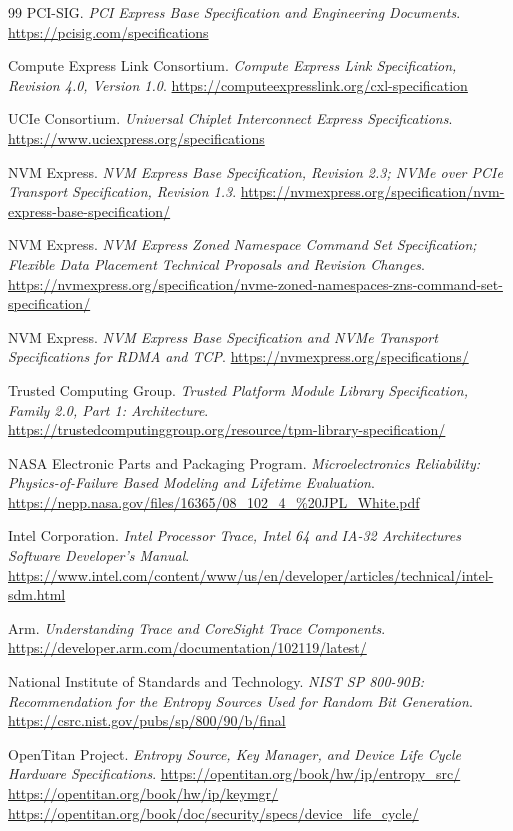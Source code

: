 \begin{thebibliography}{99}
PCI-SIG.
\emph{PCI Express Base Specification and Engineering Documents}.
\url{https://pcisig.com/specifications}

Compute Express Link Consortium.
\emph{Compute Express Link Specification, Revision 4.0, Version 1.0}.
\url{https://computeexpresslink.org/cxl-specification}

UCIe Consortium.
\emph{Universal Chiplet Interconnect Express Specifications}.
\url{https://www.uciexpress.org/specifications}

NVM Express.
\emph{NVM Express Base Specification, Revision 2.3; NVMe over PCIe Transport Specification, Revision 1.3}.
\url{https://nvmexpress.org/specification/nvm-express-base-specification/}

NVM Express.
\emph{NVM Express Zoned Namespace Command Set Specification; Flexible Data Placement Technical Proposals and Revision Changes}.
\url{https://nvmexpress.org/specification/nvme-zoned-namespaces-zns-command-set-specification/}

NVM Express.
\emph{NVM Express Base Specification and NVMe Transport Specifications for RDMA and TCP}.
\url{https://nvmexpress.org/specifications/}

Trusted Computing Group.
\emph{Trusted Platform Module Library Specification, Family 2.0, Part 1: Architecture}.
\url{https://trustedcomputinggroup.org/resource/tpm-library-specification/}

NASA Electronic Parts and Packaging Program.
\emph{Microelectronics Reliability: Physics-of-Failure Based Modeling and Lifetime Evaluation}.
\url{https://nepp.nasa.gov/files/16365/08_102_4_%20JPL_White.pdf}

Intel Corporation.
\emph{Intel Processor Trace, Intel 64 and IA-32 Architectures Software Developer's Manual}.
\url{https://www.intel.com/content/www/us/en/developer/articles/technical/intel-sdm.html}

Arm.
\emph{Understanding Trace and CoreSight Trace Components}.
\url{https://developer.arm.com/documentation/102119/latest/}

National Institute of Standards and Technology.
\emph{NIST SP 800-90B: Recommendation for the Entropy Sources Used for Random Bit Generation}.
\url{https://csrc.nist.gov/pubs/sp/800/90/b/final}

OpenTitan Project.
\emph{Entropy Source, Key Manager, and Device Life Cycle Hardware Specifications}.
\url{https://opentitan.org/book/hw/ip/entropy_src/}
\url{https://opentitan.org/book/hw/ip/keymgr/}
\url{https://opentitan.org/book/doc/security/specs/device_life_cycle/}


\end{thebibliography}
